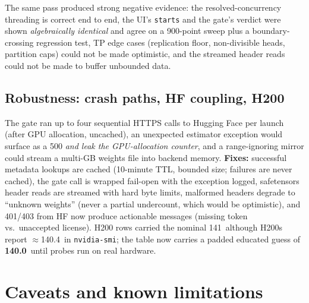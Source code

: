 \documentclass[11pt]{article}
\newcommand{\code}[1]{\texttt{#1}}
\newcommand{\gib}{\,\text{GiB}}
\begin{document}
The same pass produced strong negative evidence: the resolved-concurrency
threading is correct end to end, the UI's \code{starts} and the gate's verdict
were shown \emph{algebraically identical} and agree on a 900-point sweep plus
a boundary-crossing regression test, TP edge cases (replication floor,
non-divisible heads, partition caps) could not be made optimistic, and the
streamed header reads could not be made to buffer unbounded data.

\subsection{Robustness: crash paths, HF coupling, H200}

The gate ran up to four sequential HTTPS calls to Hugging Face per launch
(after GPU allocation, uncached), an unexpected estimator exception would
surface as a 500 \emph{and leak the GPU-allocation counter}, and a
range-ignoring mirror could stream a multi-GB weights file into backend
memory. \textbf{Fixes:} successful metadata lookups are cached (10-minute
TTL, bounded size; failures are never cached), the gate call is wrapped
fail-open with the exception logged, safetensors header reads are streamed
with hard byte limits, malformed headers degrade to ``unknown weights''
(never a partial undercount, which would be optimistic), and 401/403 from HF
now produce actionable messages (missing token vs.\ unaccepted license).
H200 rows carried the nominal 141\gib{} although H200s report
$\approx$140.4\gib{} in \code{nvidia-smi}; the table now carries a padded
educated guess of \textbf{140.0\gib} until probes run on real hardware.

\section{Caveats and known limitations}
\end{document}
